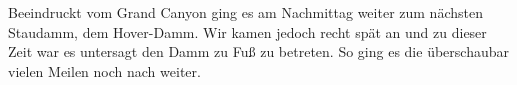 \newpage
\thispagestyle{empty}
\newpage

Beeindruckt vom Grand Canyon ging es am Nachmittag weiter zum nächsten Staudamm, dem Hover-Damm.
Wir kamen jedoch recht spät an und zu dieser Zeit war es untersagt den Damm zu Fuß zu betreten.
So ging es die überschaubar vielen Meilen noch nach  weiter.\\

